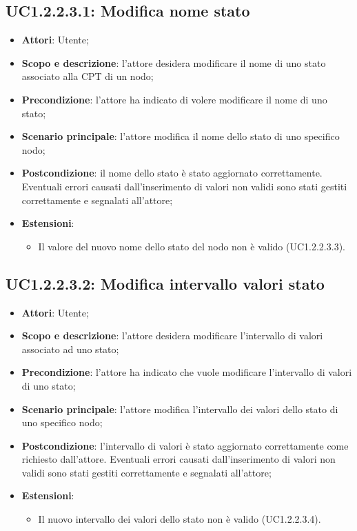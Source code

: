 \subsection{UC1.2.2.3.1: Modifica nome stato} 
\hypertarget{UC1.2.2.3.1}{} 
\begin{itemize} 
	\item{\textbf{Attori}: Utente;} 
	\item{\textbf{Scopo e descrizione}: l'attore desidera modificare il nome di uno stato associato alla CPT di un nodo;} 
	\item{\textbf{Precondizione}: l'attore ha indicato di volere modificare il nome di uno stato;}
	\item{\textbf{Scenario principale}: l'attore modifica il nome dello stato di uno specifico nodo;} 
	\item{\textbf{Postcondizione}: il nome dello stato è stato aggiornato correttamente. Eventuali errori causati dall'inserimento di valori non validi sono stati gestiti correttamente e segnalati all'attore;}
	\item{\textbf{Estensioni}:
		\begin{itemize}
			\item{Il valore del nuovo nome dello stato del nodo non è valido (UC1.2.2.3.3)}.
		\end{itemize}
	}
\end{itemize} 
\subsection{UC1.2.2.3.2: Modifica intervallo valori stato} 
\hypertarget{UC1.2.2.3.2}{} 
\begin{itemize} 
	\item{\textbf{Attori}: Utente;} 
	\item{\textbf{Scopo e descrizione}: l'attore desidera modificare l'intervallo di valori associato ad uno stato;} 
	\item{\textbf{Precondizione}: l'attore ha indicato che vuole modificare l'intervallo di valori di uno stato;} 
	\item{\textbf{Scenario principale}: l'attore modifica l'intervallo dei valori dello stato di uno specifico nodo;}
	\item{\textbf{Postcondizione}: l'intervallo di valori è stato aggiornato correttamente come richiesto dall'attore. Eventuali errori causati dall'inserimento di valori non validi sono stati gestiti correttamente e segnalati all'attore;}
	\item{\textbf{Estensioni}:
		\begin{itemize}
			\item{Il nuovo intervallo dei valori dello stato non è valido (UC1.2.2.3.4).}
		\end{itemize}
	}
\end{itemize}
